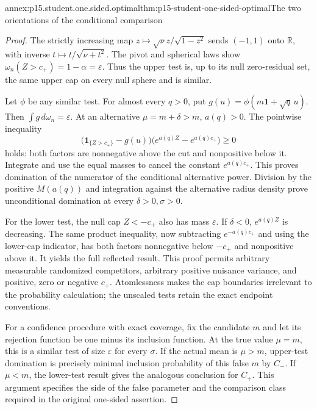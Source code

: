 \begin{annexitem}{annex:p15.student.one.sided.optimal}{thm:p15-student-one-sided-optimal}{The two orientations of the conditional comparison}
\begin{proof}
The strictly increasing map
\(z\mapsto\sqrt\nu z/\sqrt{1-z^2}\) sends
\((-1,1)\) onto \(\mathbb R\), with inverse
\(t\mapsto t/\sqrt{\nu+t^2}\).
The pivot and spherical laws show
\(\omega_n(Z>c_+)=1-\alpha=\varepsilon\).
Thus the upper test is, up to its null
zero-residual set, the same upper cap on
every null sphere and is similar.

Let \(\phi\) be any similar test.
For almost every \(q>0\), put
\(g(u)=\phi(m\mathbf1+\sqrt q\,u)\).
Then \(\int g\,d\omega_n=\varepsilon\).
At an alternative \(\mu=m+\delta>m\),
\(a(q)>0\). The pointwise inequality
\[
  \bigl(\mathbf1_{\{Z>c_+\}}-g(u)\bigr)
                  \bigl(e^{a(q)Z}-e^{a(q)c_+}\bigr)\geq0
\]
holds: both factors are nonnegative above the
cut and nonpositive below it. Integrate and
use the equal masses to cancel the constant
\(e^{a(q)c_+}\). This proves domination of
the numerator of the conditional alternative
power. Division by the positive \(M(a(q))\)
and integration against the alternative radius
density prove unconditional domination at
every \(\delta>0,\sigma>0\).

For the lower test, the null cap \(Z<-c_+\)
also has mass \(\varepsilon\).
If \(\delta<0\), \(e^{a(q)Z}\) is decreasing.
The same product inequality, now subtracting
\(e^{-a(q)c_+}\) and using the lower-cap indicator,
has both factors nonnegative below \(-c_+\)
and nonpositive above it. It yields the full
reflected result. This proof permits arbitrary
measurable randomized competitors, arbitrary
positive nuisance variance, and positive,
zero or negative \(c_+\). Atomlessness makes
the cap boundaries irrelevant to the
probability calculation; the unscaled tests
retain the exact endpoint conventions.

For a confidence procedure with exact coverage,
fix the candidate \(m\) and let its rejection
function be one minus its inclusion function.
At the true value \(\mu=m\), this is a similar
test of size \(\varepsilon\) for every \(\sigma\).
If the actual mean is \(\mu>m\), upper-test
domination is precisely minimal inclusion
probability of this false \(m\) by \(C_-\).
If \(\mu<m\), the lower-test result gives
the analogous conclusion for \(C_+\).
This argument specifies the side of the
false parameter and the comparison class
required in the original one-sided assertion.
\end{proof}
\end{annexitem}

